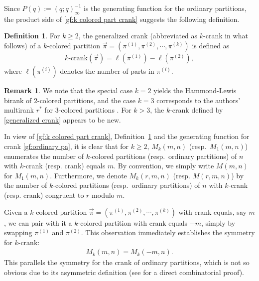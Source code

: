 \documentclass[12pt]{amsart}
\numberwithin{equation}{section}
\theoremstyle{plain}
\theoremstyle{definition}
\newtheorem{Def}[theorem]{Definition}
\newtheorem{remark}[theorem]{Remark}
\begin{document}
Since $P(q):=(q;q)_{\infty}^{-1}$ is the generating function for the ordinary partitions, the product side of \eqref{gf:k colored part crank} suggests the following definition.
\begin{Def}\label{k-crank}
For $k\geq 2$, the generalized crank (abbreviated as $k$-crank in what follows) of a $k$-colored partition $\overrightarrow{\pi}=(\pi^{(1)},\pi^{(2)},\cdots,\pi^{(k)})$ is defined as
\begin{align}\label{generalized crank}
\textrm{$k$-crank}(\overrightarrow{\pi})=\ell(\pi^{(1)})-\ell(\pi^{(2)}),
\end{align}
where $\ell(\pi^{(i)})$ denotes the number of parts in $\pi^{(i)}$.
\end{Def}

\begin{remark}
We note that the special case $k=2$ yields the Hammond-Lewis birank \cite{HL} of $2$-colored partitions, and the case $k=3$ corresponds to the authors' multirank $r^{*}$ for $3$-colored partitions \cite{FT}. For $k>3$, the $k$-crank defined by \eqref{generalized crank} appears to be new.
\end{remark}

In view of \eqref{gf:k colored part crank}, Definition~\ref{k-crank} and the generating function for crank \eqref{gf:ordinary pa}, it is clear that for $k\geq 2$, $M_{k}(m,n)$ (resp.~$M_1(m,n)$) enumerates the number of $k$-colored partitions (resp.~ordinary partitions) of $n$ with $k$-crank (resp. crank) equals $m$. By convention, we simply write $M(m,n)$ for $M_1(m,n)$. Furthermore, we denote $M_{k}(r,m,n)$ (resp. $M(r,m,n)$) by the number of $k$-colored partitions (resp.~ordinary partitions) of $n$ with $k$-crank (resp. crank) congruent to $r$ modulo $m$.

Given a $k$-colored partition $\overrightarrow{\pi}=(\pi^{(1)},\pi^{(2)},\cdots,\pi^{(k)})$ with crank equals, say $m$, we can pair with it a $k$-colored partition with crank equals $-m$, simply by swapping $\pi^{(1)}$ and $\pi^{(2)}$. This observation immediately establishes the symmetry for $k$-crank:
\begin{align}\label{sym-kcrank}
M_k(m,n)=M_k(-m,n).
\end{align}
This parallels the symmetry for the crank of ordinary partitions, which is not so obvious due to its asymmetric definition (see \cite{BG} for a direct combinatorial proof).
\end{document}
